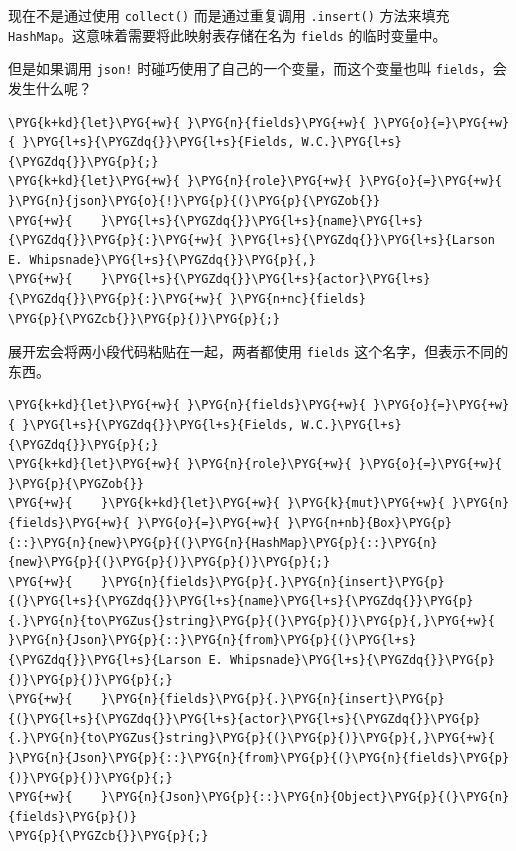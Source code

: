 现在不是通过使用 \texttt{collect()} 而是通过重复调用 \texttt{.insert()} 方法来填充 \texttt{HashMap}。这意味着需要将此映射表存储在名为 \texttt{fields} 的临时变量中。

但是如果调用 \texttt{json!} 时碰巧使用了自己的一个变量，而这个变量也叫 \texttt{fields}，会发生什么呢？

\begin{Verbatim}[commandchars=\\\{\},breaklines=true,breakanywhere=true,fontsize=\codefont,xleftmargin=17bp]
\PYG{k+kd}{let}\PYG{+w}{ }\PYG{n}{fields}\PYG{+w}{ }\PYG{o}{=}\PYG{+w}{ }\PYG{l+s}{\PYGZdq{}}\PYG{l+s}{Fields, W.C.}\PYG{l+s}{\PYGZdq{}}\PYG{p}{;}
\PYG{k+kd}{let}\PYG{+w}{ }\PYG{n}{role}\PYG{+w}{ }\PYG{o}{=}\PYG{+w}{ }\PYG{n}{json}\PYG{o}{!}\PYG{p}{(}\PYG{p}{\PYGZob{}}
\PYG{+w}{    }\PYG{l+s}{\PYGZdq{}}\PYG{l+s}{name}\PYG{l+s}{\PYGZdq{}}\PYG{p}{:}\PYG{+w}{ }\PYG{l+s}{\PYGZdq{}}\PYG{l+s}{Larson E. Whipsnade}\PYG{l+s}{\PYGZdq{}}\PYG{p}{,}
\PYG{+w}{    }\PYG{l+s}{\PYGZdq{}}\PYG{l+s}{actor}\PYG{l+s}{\PYGZdq{}}\PYG{p}{:}\PYG{+w}{ }\PYG{n+nc}{fields}
\PYG{p}{\PYGZcb{}}\PYG{p}{)}\PYG{p}{;}
\end{Verbatim}

展开宏会将两小段代码粘贴在一起，两者都使用 \texttt{fields} 这个名字，但表示不同的东西。

\begin{Verbatim}[commandchars=\\\{\},breaklines=true,breakanywhere=true,fontsize=\codefont,xleftmargin=17bp]
\PYG{k+kd}{let}\PYG{+w}{ }\PYG{n}{fields}\PYG{+w}{ }\PYG{o}{=}\PYG{+w}{ }\PYG{l+s}{\PYGZdq{}}\PYG{l+s}{Fields, W.C.}\PYG{l+s}{\PYGZdq{}}\PYG{p}{;}
\PYG{k+kd}{let}\PYG{+w}{ }\PYG{n}{role}\PYG{+w}{ }\PYG{o}{=}\PYG{+w}{ }\PYG{p}{\PYGZob{}}
\PYG{+w}{    }\PYG{k+kd}{let}\PYG{+w}{ }\PYG{k}{mut}\PYG{+w}{ }\PYG{n}{fields}\PYG{+w}{ }\PYG{o}{=}\PYG{+w}{ }\PYG{n+nb}{Box}\PYG{p}{::}\PYG{n}{new}\PYG{p}{(}\PYG{n}{HashMap}\PYG{p}{::}\PYG{n}{new}\PYG{p}{(}\PYG{p}{)}\PYG{p}{)}\PYG{p}{;}
\PYG{+w}{    }\PYG{n}{fields}\PYG{p}{.}\PYG{n}{insert}\PYG{p}{(}\PYG{l+s}{\PYGZdq{}}\PYG{l+s}{name}\PYG{l+s}{\PYGZdq{}}\PYG{p}{.}\PYG{n}{to\PYGZus{}string}\PYG{p}{(}\PYG{p}{)}\PYG{p}{,}\PYG{+w}{ }\PYG{n}{Json}\PYG{p}{::}\PYG{n}{from}\PYG{p}{(}\PYG{l+s}{\PYGZdq{}}\PYG{l+s}{Larson E. Whipsnade}\PYG{l+s}{\PYGZdq{}}\PYG{p}{)}\PYG{p}{)}\PYG{p}{;}
\PYG{+w}{    }\PYG{n}{fields}\PYG{p}{.}\PYG{n}{insert}\PYG{p}{(}\PYG{l+s}{\PYGZdq{}}\PYG{l+s}{actor}\PYG{l+s}{\PYGZdq{}}\PYG{p}{.}\PYG{n}{to\PYGZus{}string}\PYG{p}{(}\PYG{p}{)}\PYG{p}{,}\PYG{+w}{ }\PYG{n}{Json}\PYG{p}{::}\PYG{n}{from}\PYG{p}{(}\PYG{n}{fields}\PYG{p}{)}\PYG{p}{)}\PYG{p}{;}
\PYG{+w}{    }\PYG{n}{Json}\PYG{p}{::}\PYG{n}{Object}\PYG{p}{(}\PYG{n}{fields}\PYG{p}{)}
\PYG{p}{\PYGZcb{}}\PYG{p}{;}
\end{Verbatim}

